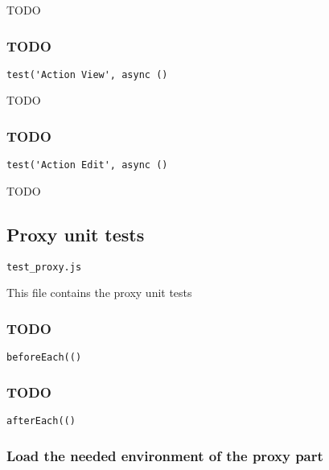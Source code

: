 \documentclass[a4paper]{article}
\begin{document}
TODO

\hypertarget{toc672}{}
\subsubsection{TODO}

\begin{lstlisting}
test('Action View', async ()
\end{lstlisting}

TODO

\hypertarget{toc673}{}
\subsubsection{TODO}

\begin{lstlisting}
test('Action Edit', async ()
\end{lstlisting}

TODO

\hypertarget{toc674}{}
\subsection{Proxy unit tests}

\begin{lstlisting}
test_proxy.js
\end{lstlisting}

This file contains the proxy unit tests

\hypertarget{toc675}{}
\subsubsection{TODO}

\begin{lstlisting}
beforeEach(()
\end{lstlisting}

\hypertarget{toc676}{}
\subsubsection{TODO}

\begin{lstlisting}
afterEach(()
\end{lstlisting}

\hypertarget{toc677}{}
\subsubsection{Load the needed environment of the proxy part}
\end{document}
